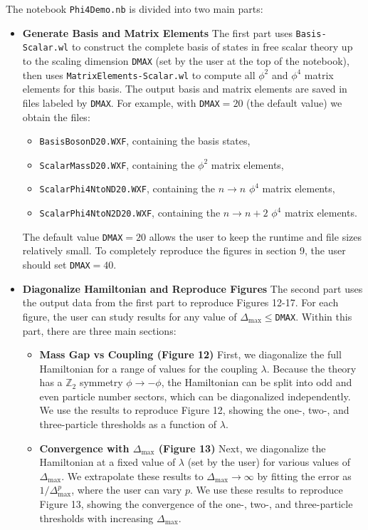 \documentclass[12pt]{article}
\newcommand\De\Delta
\newcommand{\ra}{\rightarrow}
\newcommand{\Dmax}{\De_{\max}}
\begin{document}
The notebook {\tt Phi4Demo.nb} is divided into two main parts:
\begin{itemize}
\item \textbf{Generate Basis and Matrix Elements} \newline
The first part uses {\tt Basis-Scalar.wl} to construct the complete basis of states in free scalar theory up to the scaling dimension {\tt DMAX} (set by the user at the top of the notebook), then uses {\tt MatrixElements-Scalar.wl} to compute all $\phi^2$ and $\phi^4$ matrix elements for this basis. The output basis and matrix elements are saved in files labeled by {\tt DMAX}. For example, with {\tt DMAX}$=20$ (the default value) we obtain the files:
\begin{itemize}
\item {\tt BasisBosonD20.WXF}, containing the basis states,
\item {\tt ScalarMassD20.WXF}, containing the $\phi^2$ matrix elements,
\item {\tt ScalarPhi4NtoND20.WXF}, containing the $n\ra n$ $\phi^4$ matrix elements,
\item {\tt ScalarPhi4NtoN2D20.WXF}, containing the $n\ra n+2$ $\phi^4$ matrix elements.
\end{itemize}
The default value {\tt DMAX}$=20$ allows the user to keep the runtime and file sizes relatively small. To completely reproduce the figures in section 9, the user should set {\tt DMAX}$=40$.
\item \textbf{Diagonalize Hamiltonian and Reproduce Figures} \newline
The second part uses the output data from the first part to reproduce Figures 12-17. For each figure, the user can study results for any value of $\Dmax \leq${\tt DMAX}. Within this part, there are three main sections:
\begin{itemize}
\item \textbf{Mass Gap vs Coupling (Figure 12)} \newline
First, we diagonalize the full Hamiltonian for a range of values for the coupling $\lambda$. Because the theory has a $\mathbb{Z}_2$ symmetry $\phi \ra -\phi$, the Hamiltonian can be split into odd and even particle number sectors, which can be diagonalized independently. We use the results to reproduce Figure 12, showing the one-, two-, and three-particle thresholds as a function of $\lambda$.
\item \textbf{Convergence with $\Dmax$ (Figure 13)} \newline
Next, we diagonalize the Hamiltonian at a fixed value of $\lambda$ (set by the user) for various values of $\Dmax$. We extrapolate these results to $\Dmax \ra \infty$ by fitting the error as $1/\Dmax^p$, where the user can vary $p$. We use these results to reproduce Figure 13, showing the convergence of the one-, two-, and three-particle thresholds with increasing $\Dmax$.

\end{itemize}
\end{itemize}
\end{document}
